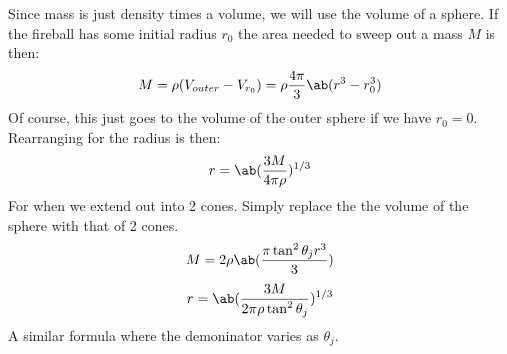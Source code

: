 
Since mass is just density times a volume, we will use the volume of a sphere. If the fireball has some initial radius $r_0$ the area needed to sweep out a mass $M$ is then:
\begin{equation}
    M = \rho(V_{outer} - V_{r_0}) = \rho\frac{4\pi}{3}\ab(r^3 - r_0^3)
\end{equation}
Of course, this just goes to the volume of the outer sphere if we have $r_0 = 0$. Rearranging for the radius is then:
\begin{equation}
    r = \ab(\frac{3M}{4\pi\rho})^{1/3}
\end{equation}
For when we extend out into 2 cones. Simply replace the the volume of the sphere with that of 2 cones.
\begin{equation}
    M = 2\rho\ab(\frac{\pi\tan^2\theta_j r^3}{3})
\end{equation}
\begin{equation}
    r = \ab(\frac{3M}{2\pi\rho\tan^2\theta_j})^{1/3}
\end{equation}
A similar formula where the demoninator varies as $\theta_j$. 
